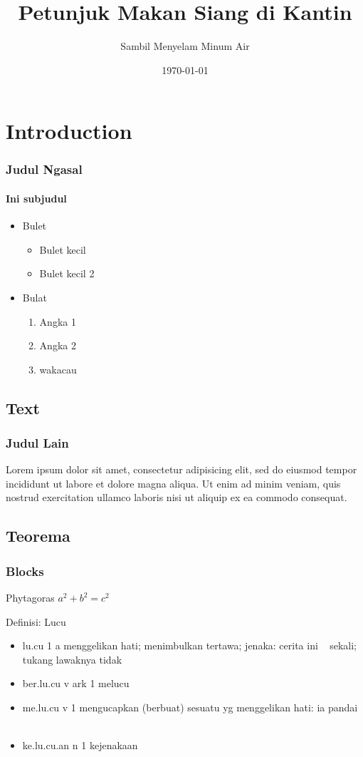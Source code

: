 \documentclass{beamer}
\title{Petunjuk Makan Siang di Kantin}
\subtitle{Sambil Menyelam Minum Air}
\date{\today}
\institute{Gedung Sate Bundar}
\begin{document}
\begin{frame}
\titlepage
\end{frame}

\section{Introduction}    
\frame{\sectionpage}
\begin{frame}
\frametitle{Judul Ngasal}
\framesubtitle{Ini subjudul}
\begin{itemize}
\item Bulet
	\begin{itemize}
	\item Bulet kecil
	\item Bulet kecil 2
	\end{itemize}
\item Bulat
	\begin{enumerate}
	\item Angka 1
	\item Angka 2
	\item \alert{wakacau}
	\end{enumerate}
\end{itemize}
\end{frame}

\subsection{Text}
\begin{frame}
\frametitle{Judul Lain}
Lorem ipsum dolor sit amet, consectetur adipisicing elit, sed do eiusmod tempor incididunt ut labore et dolore magna aliqua. Ut enim ad minim veniam, quis nostrud exercitation ullamco laboris nisi ut aliquip ex ea commodo consequat.
\end{frame}

\subsection{Teorema}
\begin{frame}
\frametitle{Blocks}
\begin{block}{Phytagoras}
$a^2 + b^2 = c^2$
\end{block}

\begin{block}{Definisi: Lucu}
\begin{itemize}
\item lu.cu 1 a menggelikan hati; menimbulkan tertawa; jenaka: cerita ini ~ sekali; tukang lawaknya tidak ~
\item ber.lu.cu v ark 1 melucu
\item me.lu.cu v 1 mengucapkan (berbuat) sesuatu yg menggelikan hati: ia pandai ~
\item ke.lu.cu.an n 1 kejenakaan
\end{itemize}
\end{block}

\end{frame}
\end{document}
